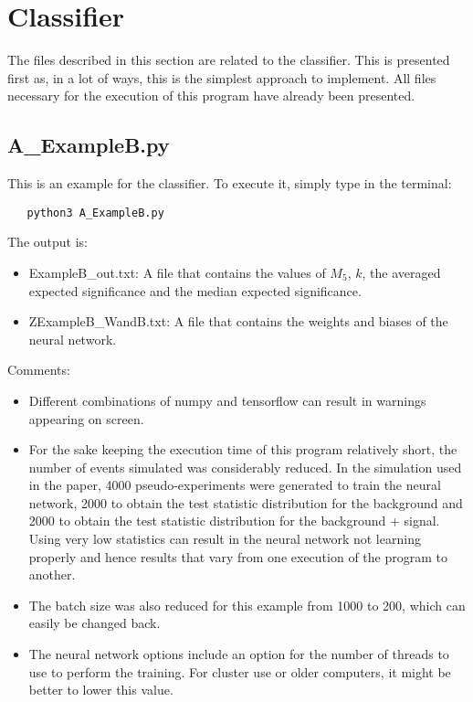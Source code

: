 \documentclass{article}
\begin{document}
\pagebreak

\section{Classifier}
The files described in this section are related to the classifier. This is presented first as, in a lot of ways, this is the simplest approach to implement. All files necessary for the execution of this program have already been presented.

\subsection{A\_ExampleB.py}
This is an example for the classifier. To execute it, simply type in the terminal:
\begin{verbatim}
   python3 A_ExampleB.py
\end{verbatim}
The output is:
\begin{itemize}
  \item ExampleB\_out.txt: A file that contains the values of $M_5$, $k$, the averaged expected significance and the median expected significance.
  \item ZExampleB\_WandB.txt: A file that contains the weights and biases of the neural network.
\end{itemize}
Comments:
\begin{itemize}
  \item Different combinations of numpy and tensorflow can result in warnings appearing on screen.
  \item For the sake keeping the execution time of this program relatively short, the number of events simulated was considerably reduced. In the simulation used in the paper, 4000 pseudo-experiments were generated to train the neural network, 2000 to obtain the test statistic distribution for the background and 2000 to obtain the test statistic distribution for the background + signal. Using very low statistics can result in the neural network not learning properly and hence results that vary from one execution of the program to another.
  \item The batch size was also reduced for this example from 1000 to 200, which can easily be changed back.
  \item The neural network options include an option for the number of threads to use to perform the training. For cluster use or older computers, it might be better to lower this value.
\end{itemize}
\end{document}
